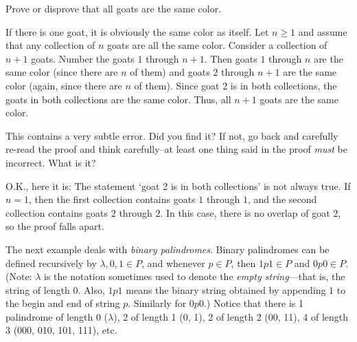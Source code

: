 \begin{eval}
Prove or disprove that all goats are the same color.
\begin{ssol}
If there is one goat, it is obviously the same color as itself.
Let $n\geq 1$ and assume that any collection of $n$ goats are
all the same color.  Consider a collection of $n+1$ goats.
Number the goats $1$ through $n+1$.
Then goats $1$ through $n$ are the same color (since there
are $n$ of them) and goats $2$ through $n+1$ are the same
color (again, since there are $n$ of them).
Since goat 2 is in both collections, the goats in both collections
are the same color.  Thus, all $n+1$ goats are the same color.
\end{ssol}
\evallinethree
\begin{answer}
This contains a very subtle error.  Did you find it?
If not, go back and carefully re-read the proof and think
carefully--at least one thing said in the proof {\em must}
be incorrect.  What is it?

O.K., here it is:  The statement `goat 2 is in both collections'
is not always true.  If $n=1$, then the first collection
contains goats $1$ through $1$, and the second collection
contains goats $2$ through $2$.  In this case, there is no overlap
of goat $2$, so the proof falls apart.
\end{answer}
\end{eval}



The next example deals with {\em binary palindromes}.
Binary palindromes can be defined recursively by $\lambda, 0, 1\in P$, and whenever $p\in P$, then
$1p1\in P$ and $0p0\in P$.  
(Note: $\lambda$ is the notation sometimes used to denote the {\em empty string}---that is, the string of length $0$.  
Also, $1p1$ means the binary string obtained by appending $1$ to the begin and end of string $p$.  Similarly for $0p0$.)
Notice that there is 1 palindrome of length 0 ($\lambda$), 2 of length 1 (0, 1),
2 of length 2 (00, 11), 4 of length 3 (000, 010, 101, 111), etc.


